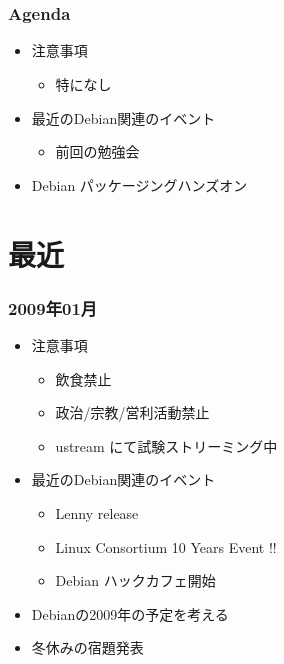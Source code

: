 \frame{\titlepage{}}


\section{}
\begin{frame}
 \frametitle{Agenda}
\begin{minipage}[t]{0.45\hsize}
  \begin{itemize}
  \item 注意事項
	\begin{itemize}
	 \item 特になし
	\end{itemize}
  \item 最近のDebian関連のイベント
	\begin{itemize}
	 \item 前回の勉強会
	\end{itemize}
 \end{itemize}
\end{minipage} 
\begin{minipage}[t]{0.45\hsize}
 \begin{itemize}
  \item Debian パッケージングハンズオン
 \end{itemize}
\end{minipage}
\end{frame}

\section{最近}

\begin{frame}
 \frametitle{2009年01月}
\begin{minipage}[t]{0.45\hsize}
  \begin{itemize}
  \item 注意事項
	\begin{itemize}
	 \item 飲食禁止
	 \item 政治/宗教/営利活動禁止
	 \item ustream にて試験ストリーミング中
	\end{itemize}
  \item 最近のDebian関連のイベント
	\begin{itemize}
  \item Lenny release
  \item Linux Consortium 10 Years Event !!
　　\item Debian ハックカフェ開始
	\end{itemize}
 \end{itemize}
\end{minipage} 
\begin{minipage}[t]{0.45\hsize}
 \begin{itemize}
  \item Debianの2009年の予定を考える
  \item 冬休みの宿題発表
 \end{itemize}
\end{minipage}
\end{frame}

